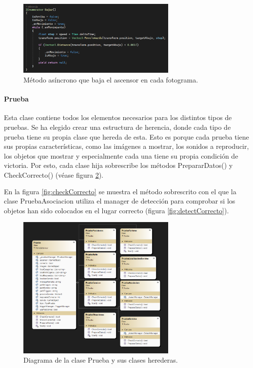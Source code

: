 \begin{figure}
	\centering
	\includegraphics[width=0.7\textwidth]{04.Desarrollo/05.Entrega5/01.Iteracion5_1/00.Figuras/17.ascensor_bajar.png}
	\caption{Método asíncrono que baja el ascensor en cada fotograma.}
	\label{fig:ascensorBajar}
\end{figure}



\paragraph{Prueba}
Esta clase contiene todos los elementos necesarios para los distintos tipos de pruebas. Se ha elegido crear una estructura de herencia, donde cada tipo de prueba tiene su propia clase que hereda de esta. Esto es porque cada prueba tiene sus propias características, como las imágenes a mostrar, los sonidos a reproducir, los objetos que mostrar y especialmente cada una tiene su propia condición de victoria. Por esto, cada clase hija sobrescribe los métodos PrepararDatos() y CheckCorrecto() (véase figura \ref{fig:diagramaPruebas}).

En la figura \ref{fig:checkCorrecto} se muestra el método sobrescrito con el que la clase PruebaAsociacion utiliza el manager de detección para comprobar si los objetos han sido colocados en el lugar correcto (figura \ref{fig:detectCorrecto}).


\begin{figure}
	\centering
	\includegraphics[width=0.7\textwidth]{04.Desarrollo/05.Entrega5/01.Iteracion5_1/00.Figuras/18.diagrama_pruebas.png}
	\caption{Diagrama de la clase Prueba y sus clases herederas.}
	\label{fig:diagramaPruebas}
\end{figure}

